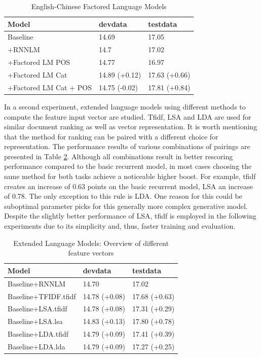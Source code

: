 \documentclass[a4paper]{article}
\begin{document}
\begin{table}
\caption{English-Chinese Factored Language Models}
\centering
  \begin{tabular}{ lll }
  	\hline
  	Model                  & devdata       & testdata      \\ \hline\hline
  	Baseline               & 14.69         & 17.05         \\
  	+RNNLM                 & 14.7          & 17.02         \\
  	+Factored LM POS       & 14.77         & 16.97         \\ \hline
  	+Factored LM Cat       & 14.89 (+0.12) & 17.63 (+0.66) \\
  	+Factored LM Cat + POS & 14.75 (-0.02) & 17.81 (+0.84) \\ \hline
  \end{tabular}
  \label{tb:zh-factored}
\end{table}

In a second experiment, extended language models using different methods to compute the feature input vector are studied. Tfidf, LSA and LDA are used for similar document ranking as well as vector representation. It is worth mentioning that the method for ranking can be paired with a different choice for representation. The performance results of various combinations of pairings are presented in Table \ref{tb:zh-extended-diff-features}. Although all combinations result in better rescoring performance compared to the basic recurrent model, in most cases choosing the same method for both tasks achieve a noticeable higher boost. For example, tfidf creates an increase of 0.63 points on the basic recurrent model, LSA an increase of 0.78. The only exception to this rule is LDA. One reason for this could be suboptimal parameter picks for this generally more complex generative model. Despite the slightly better performance of LSA, tfidf is employed in the following experiments due to its simplicity and, thus, faster training and evaluation.

\begin{table}
\caption{Extended Language Models: Overview of different feature vectors}
\centering
  \begin{tabular}{lll}
  	\hline
  	Model                & devdata       & testdata      \\ \hline\hline
  	Baseline+RNNLM       & 14.70         & 17.02         \\ \hline
  	Baseline+TFIDF.tfidf & 14.78 (+0.08) & 17.68 (+0.63) \\
  	Baseline+LSA.tfidf   & 14.78 (+0.08) & 17.31 (+0.29) \\
  	Baseline+LSA.lsa     & 14.83 (+0.13) & 17.80 (+0.78) \\
  	Baseline+LDA.tfidf   & 14.79 (+0.09) & 17.41 (+0.39) \\
  	Baseline+LDA.lda     & 14.79 (+0.09) & 17.27 (+0.25)
  \end{tabular}
  \label{tb:zh-extended-diff-features}
\end{table}
\end{document}
